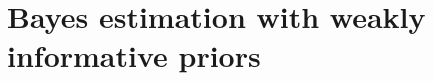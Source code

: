 \renewcommand\chaptername{Appendix}
\chapter{Bayes estimation with weakly informative priors}
\label{apd:bayes_weakpriors}







% 

\begin{sidewaystable}

\end{sidewaystable}